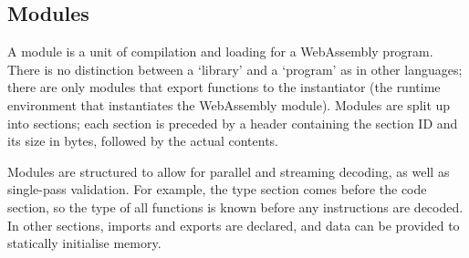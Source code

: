 \documentclass[00-main.tex]{subfiles}
\begin{document}
%
%

\subsection{Modules}

A module is a unit of compilation and loading for a WebAssembly program.
There is no distinction between a `library' and a `program' as in other languages; there are only modules that export functions to the instantiator (the runtime environment that instantiates the WebAssembly module).
Modules are split up into sections; each section is preceded by a header containing the section ID and its size in bytes, followed by the actual contents.

Modules are structured to allow for parallel and streaming decoding, as well as single-pass validation.
For example, the type section comes before the code section, so the type of all functions is known before any instructions are decoded.
In other sections, imports and exports are declared, and data can be provided to statically initialise memory.
\end{document}

